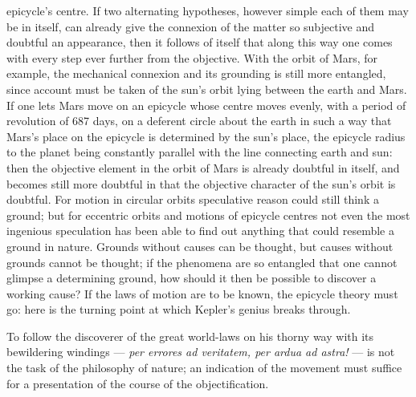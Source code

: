 \documentclass[12pt,a4paper]{book}
\begin{document}
epicycle's centre. If two alternating hypotheses, however
simple each of them may be in itself, can already give the connexion of the matter so subjective and
doubtful an appearance, then it follows of itself that along this way one comes with every step ever
further from the objective. With the orbit of Mars, for example, the mechanical connexion and its
grounding is still more entangled, since account must be taken of the sun's orbit lying between the earth
and Mars. If one lets Mars move on an epicycle whose centre moves evenly, with a period of revolution of
687 days, on a deferent circle about the earth in such a way that Mars's place on the epicycle is
determined by the sun's place, the epicycle radius to the planet being constantly parallel with the line
connecting earth and sun: then the objective element in the orbit of Mars is already doubtful in itself,
and becomes still more doubtful in that the objective character of the sun's orbit is doubtful. For motion
in circular orbits speculative reason could still think a ground; but for eccentric orbits and motions of
epicycle centres not even the most ingenious speculation has been able to find out anything that could
resemble a ground in nature. Grounds without causes can be thought, but causes without grounds cannot be
thought; if the phenomena are so entangled that one cannot glimpse a determining ground, how should it
then be possible to discover a working cause? If the laws of motion are to be known, the epicycle theory
must go: here is the turning point at which Kepler's genius breaks through.

To follow the discoverer of the great world-laws on his thorny way with its bewildering windings ---
\textit{per errores ad veritatem, per ardua ad astra!} --- is not the task of the philosophy of nature; an
indication of the movement must suffice for a presentation of the course of the objectification.
\end{document}
